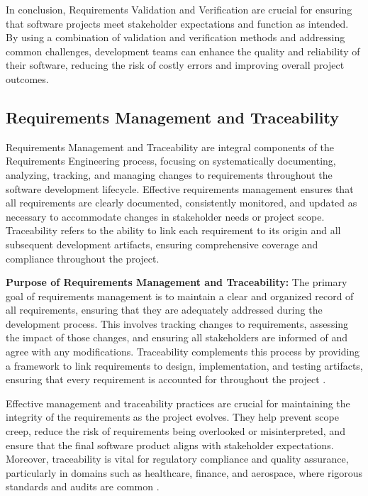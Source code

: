 \begin{refsection}
In conclusion, Requirements Validation and Verification are crucial for ensuring that software projects meet stakeholder expectations and function as intended. By using a combination of validation and verification methods and addressing common challenges, development teams can enhance the quality and reliability of their software, reducing the risk of costly errors and improving overall project outcomes.

\subsection{Requirements Management and Traceability}

Requirements Management and Traceability are integral components of the Requirements Engineering process, focusing on systematically documenting, analyzing, tracking, and managing changes to requirements throughout the software development lifecycle. Effective requirements management ensures that all requirements are clearly documented, consistently monitored, and updated as necessary to accommodate changes in stakeholder needs or project scope. Traceability refers to the ability to link each requirement to its origin and all subsequent development artifacts, ensuring comprehensive coverage and compliance throughout the project.

\textbf{Purpose of Requirements Management and Traceability:} The primary goal of requirements management is to maintain a clear and organized record of all requirements, ensuring that they are adequately addressed during the development process. This involves tracking changes to requirements, assessing the impact of those changes, and ensuring all stakeholders are informed of and agree with any modifications. Traceability complements this process by providing a framework to link requirements to design, implementation, and testing artifacts, ensuring that every requirement is accounted for throughout the project \cite[pp.~310-330]{hull2018requirements}.

Effective management and traceability practices are crucial for maintaining the integrity of the requirements as the project evolves. They help prevent scope creep, reduce the risk of requirements being overlooked or misinterpreted, and ensure that the final software product aligns with stakeholder expectations. Moreover, traceability is vital for regulatory compliance and quality assurance, particularly in domains such as healthcare, finance, and aerospace, where rigorous standards and audits are common \cite[pp.~220-240]{wiegers2013software}.


\end{refsection}
